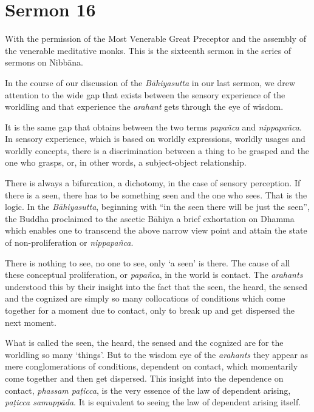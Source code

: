 \chapter{Sermon 16}

\NibbanaOpeningQuote

With the permission of the Most Venerable Great Preceptor and the assembly of the venerable meditative monks. This is the sixteenth sermon in the series of sermons on Nibbāna.

In the course of our discussion of the \emph{Bāhiyasutta} in our last sermon, we drew attention to the wide gap that exists between the sensory experience of the worldling and that experience the \emph{arahant} gets through the eye of wisdom.

It is the same gap that obtains between the two terms \emph{papañca} and \emph{nippapañca}. In sensory experience, which is based on worldly expressions, worldly usages and worldly concepts, there is a discrimination between a thing to be grasped and the one who grasps, or, in other words, a subject-object relationship.

There is always a bifurcation, a dichotomy, in the case of sensory perception. If there is a seen, there has to be something seen and the one who sees. That is the logic. In the \emph{Bāhiyasutta}, beginning with ``in the seen there will be just the seen'', the Buddha proclaimed to the ascetic Bāhiya a brief exhortation on Dhamma which enables one to transcend the above narrow view point and attain the state of non-proliferation or \emph{nippapañca}.

There is nothing to see, no one to see, only `a seen' is there. The cause of all these conceptual proliferation, or \emph{papañca}, in the world is contact. The \emph{arahants} understood this by their insight into the fact that the seen, the heard, the sensed and the cognized are simply so many collocations of conditions which come together for a moment due to contact, only to break up and get dispersed the next moment.

What is called the seen, the heard, the sensed and the cognized are for the worldling so many `things'. But to the wisdom eye of the \emph{arahants} they appear as mere conglomerations of conditions, dependent on contact, which momentarily come together and then get dispersed. This insight into the dependence on contact, \emph{phassam paṭicca}, is the very essence of the law of dependent arising, \emph{paṭicca samuppāda}. It is equivalent to seeing the law of dependent arising itself.


